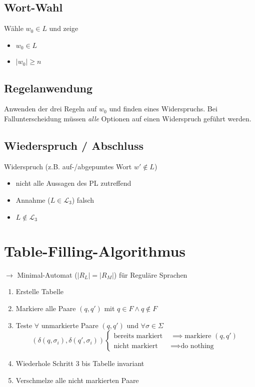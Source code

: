 \documentclass[a4paper,parskip=half,footsepline=on,headings=normal,titlepage=false]{scrartcl}
\begin{document}
\subsection{Wort-Wahl}
Wähle $w_0 \in L$ und zeige 
\begin{itemize}
    \item $w_0 \in L$
    \item $|w_0| \ge n$
\end{itemize}

\subsection{Regelanwendung}
Anwenden der drei Regeln auf $w_0$ und finden eines Widerspruchs.
Bei Fallunterscheidung müssen \emph{alle} Optionen auf einen Widerspruch geführt werden.

\subsection{Wiederspruch / Abschluss}
Widerspruch (z.B. auf-/abgepumtes Wort $w' \notin L$)
\begin{itemize}[leftmargin=2.0cm,label=$\implies$]
    \item nicht alle Aussagen des \ac{PL} zutreffend
    \item Annahme ($L \in \mathcal{L}_3$) falsch
    \item $L \notin \mathcal{L}_3$
\end{itemize}

\section{Table-Filling-Algorithmus}
$\rightarrow$ Minimal-Automat ($|R_L| = |R_M|$) für Reguläre Sprachen

\begin{enumerate}
    \item Erstelle Tabelle
    \item Markiere alle Paare $(q, q')$ mit $q\in F \wedge q\notin F$
    \item Teste $\forall$ unmarkierte Paare $(q, q')$ und $\forall \sigma \in \Sigma$
    \[
     (\delta(q,\sigma_i), \delta(q',\sigma_i))
      \begin{cases} 
       \text{bereits markiert } & \implies \text{markiere } (q, q') \\
       \text{nicht markiert } & \implies \text{do nothing}
      \end{cases}
    \]
    \item Wiederhole Schritt 3 bis Tabelle invariant
    \item Verschmelze alle nicht markierten Paare
\end{enumerate}
\end{document}
